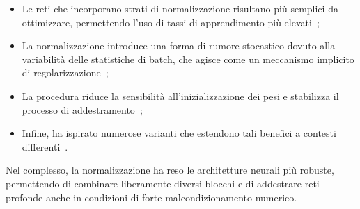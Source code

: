\begin{itemize}
    \item Le reti che incorporano strati di normalizzazione risultano più semplici da ottimizzare, permettendo l’uso di tassi di apprendimento più elevati~\parencite{Santurkar2018BNTheory};
    \item La normalizzazione introduce una forma di rumore stocastico dovuto alla variabilità delle statistiche di batch, che agisce come un meccanismo implicito di regolarizzazione~\parencite{Bjorck2018UnderstandingBN};
    \item La procedura riduce la sensibilità all’inizializzazione dei pesi e stabilizza il processo di addestramento~\parencite{Bjorck2021BNStability};
    \item Infine, ha ispirato numerose varianti che estendono tali benefici a contesti differenti~\parencite{Ba2016LayerNorm, Wu2018GroupNorm}.
\end{itemize}

Nel complesso, la normalizzazione ha reso le architetture neurali più robuste, permettendo di combinare liberamente diversi blocchi e di addestrare reti profonde anche in condizioni di forte malcondizionamento numerico.
